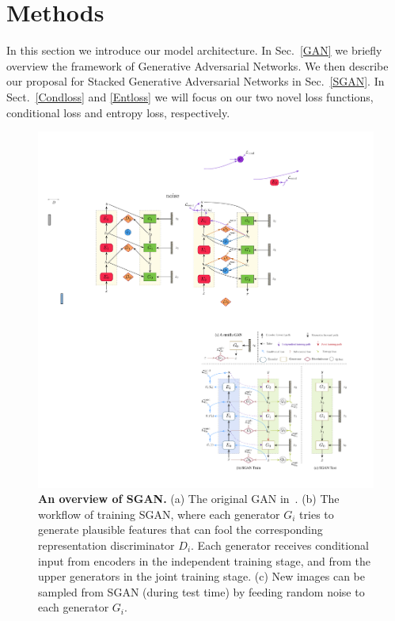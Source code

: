 \documentclass[10pt,twocolumn,letterpaper]{article}
\begin{document}
\section{Methods}
\label{methods}

In this section we introduce our model architecture. In Sec.~\ref{GAN} we briefly overview the framework of Generative Adversarial Networks. We then describe our proposal for Stacked Generative Adversarial Networks in Sec.~\ref{SGAN}. In Sect.~\ref{Condloss} and \ref{Entloss} we will focus on our two novel loss functions, conditional loss and entropy loss, respectively. %

\begin{figure}[!htbp]
\centering
\includegraphics[width=0.9\linewidth]{figures/sgan-yixuan.pdf}
   \caption{\textbf{An overview of SGAN.} (a) The original GAN in~\cite{goodfellow2014generative}. (b) The workflow of training SGAN, where each generator $G_i$ tries to generate plausible features that can fool the corresponding representation discriminator $D_i$. Each generator receives conditional input from encoders in the independent training stage, and from the upper generators in the joint training stage. (c) New images can be sampled from SGAN (during test time) by feeding random noise to each generator $G_i$.}
\label{fig:sgan}
\vspace{-0.3cm}
\end{figure}
\end{document}
